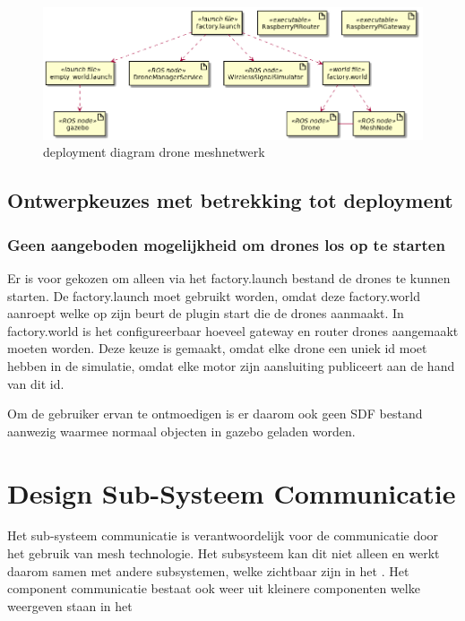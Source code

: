 \documentclass[a4paper, 11pt, oneside]{report}
\begin{document}
\begin{figure}[H]
	\begin{center}\includegraphics[width=\linewidth]{UML/out/DeploymentDiagram/DeploymentDiagram/DeploymentDiagram.png}\end{center}
	\caption{deployment diagram drone meshnetwerk}
	\label{fig:deploymentdiagram}
\end{figure}

\subsection{Ontwerpkeuzes met betrekking tot deployment}
\label{DetailedDesign:deployment:decisisions}

\subsubsection{Geen aangeboden mogelijkheid om drones los op te starten}
Er is voor gekozen om alleen via het factory.launch bestand de drones te kunnen starten. 
De factory.launch moet gebruikt worden, omdat deze factory.world aanroept welke op zijn beurt de plugin start die de drones aanmaakt.  
In factory.world is het configureerbaar hoeveel gateway en router drones aangemaakt moeten worden.
Deze keuze is gemaakt, omdat elke drone een uniek id moet hebben in de simulatie, omdat elke motor zijn aansluiting publiceert aan de hand van dit id.

Om de gebruiker ervan te ontmoedigen is er daarom ook geen SDF bestand aanwezig waarmee normaal objecten in gazebo geladen worden. 

\section{Design Sub-Systeem Communicatie}
Het sub-systeem communicatie is verantwoordelijk voor de communicatie door het gebruik van mesh technologie.
Het subsysteem kan dit niet alleen en werkt daarom samen met andere subsystemen, welke zichtbaar zijn in het  .
Het component communicatie bestaat ook weer uit kleinere componenten welke weergeven staan in het 
  
\end{document}
